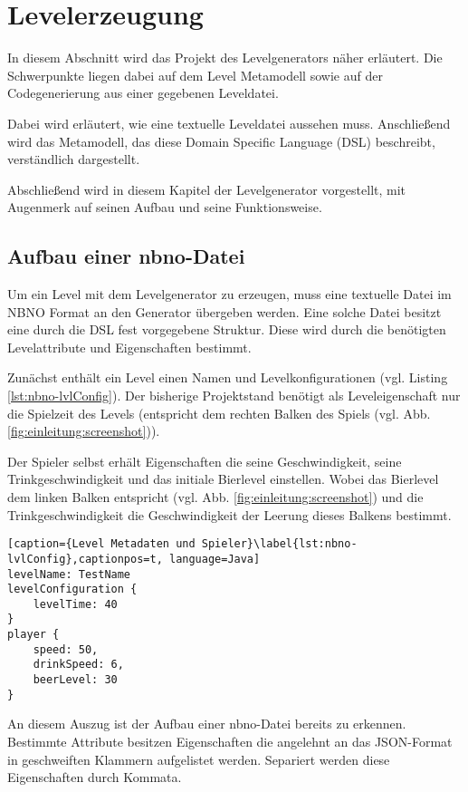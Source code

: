 \section{Levelerzeugung}\label{sec:levelerzeugung}

In diesem Abschnitt wird das Projekt des Levelgenerators näher erläutert. Die Schwerpunkte liegen dabei auf dem Level Metamodell sowie auf der Codegenerierung aus einer gegebenen Leveldatei. 
 
Dabei wird erläutert, wie eine textuelle Leveldatei aussehen muss. Anschließend wird das Metamodell, das diese  Domain Specific Language (DSL) beschreibt, verständlich dargestellt.

Abschließend wird in diesem Kapitel der Levelgenerator vorgestellt, mit Augenmerk auf seinen Aufbau und seine Funktionsweise.

\subsection{Aufbau einer nbno-Datei}
Um ein Level mit dem Levelgenerator zu erzeugen, muss eine textuelle Datei im NBNO Format an den Generator übergeben werden. Eine solche Datei besitzt eine durch die DSL fest vorgegebene Struktur. Diese wird durch die benötigten Levelattribute und Eigenschaften bestimmt.

Zunächst enthält ein Level einen Namen und Levelkonfigurationen (vgl. Listing \ref{lst:nbno-lvlConfig}). Der bisherige Projektstand benötigt als Leveleigenschaft nur die Spielzeit des Levels (entspricht dem rechten Balken des Spiels (vgl. Abb. \ref{fig:einleitung:screenshot})).

Der Spieler selbst erhält Eigenschaften die seine Geschwindigkeit, seine Trinkgeschwindigkeit und das initiale Bierlevel einstellen. Wobei das Bierlevel dem linken Balken entspricht (vgl. Abb. \ref{fig:einleitung:screenshot}) und die Trinkgeschwindigkeit die Geschwindigkeit der Leerung dieses Balkens bestimmt.

\begin{lstlisting}[caption={Level Metadaten und Spieler}\label{lst:nbno-lvlConfig},captionpos=t, language=Java]
levelName: TestName
levelConfiguration {
    levelTime: 40
}
player {
    speed: 50,
    drinkSpeed: 6,
    beerLevel: 30
}
\end{lstlisting}

An diesem Auszug ist der Aufbau einer nbno-Datei bereits zu erkennen. Bestimmte Attribute besitzen Eigenschaften die angelehnt an das JSON-Format in geschweiften Klammern aufgelistet werden. Separiert werden diese Eigenschaften durch Kommata.

